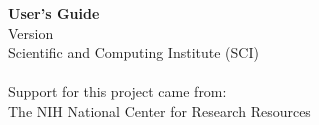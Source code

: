%
%
%
%
%
\begin{center}
  {\huge\bf \sr{} User's Guide}\\
  \vspace{.5in}
  {\Large Version \version{}} \\
  \medskip
  {\Large 
    Scientific and Computing Institute (SCI)\\
    \\
    \bigskip
    Support for this project came from:\\
    \medskip
    The NIH National Center for Research Resources  
    }
\end{center}

